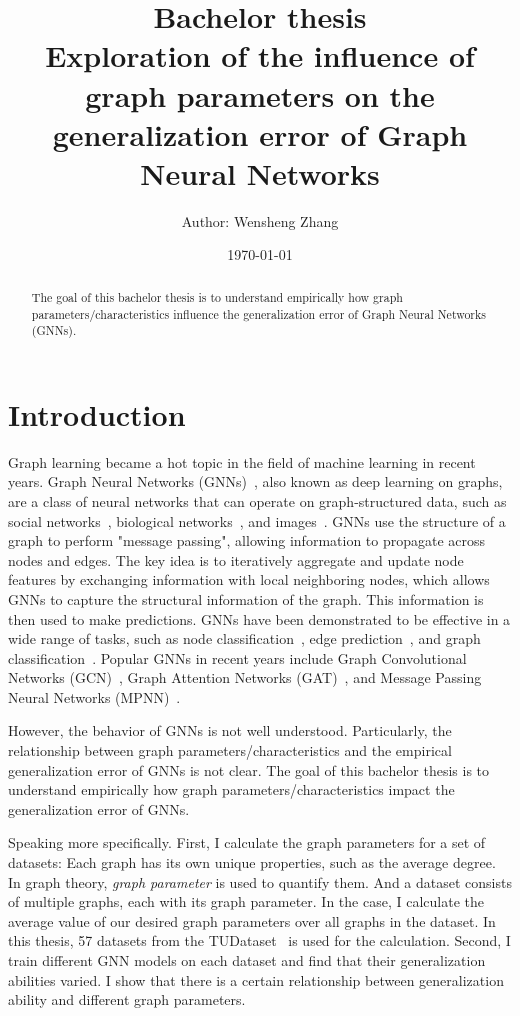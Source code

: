 \documentclass{article}
\title{\textbf{Bachelor thesis}\\
Exploration of the influence of graph parameters on the generalization error of Graph Neural Networks}
\author{Author: Wensheng Zhang}
\date{\today}
\begin{document}
 

\maketitle



\begin{abstract}
The goal of this bachelor thesis is to understand empirically how graph parameters/characteristics influence the generalization error of Graph Neural Networks (GNNs).
\end{abstract}

\section{Introduction}\label{sec:intro}
Graph learning became a hot topic in the field of machine learning in recent years. Graph Neural Networks (GNNs)~\cite{gori2005new}, also known as deep learning on graphs, are a class of neural networks that can operate on graph-structured data, such as social networks~\cite{easley2010networks}, biological networks~\cite{barabasi2004network}, and images~\cite{simonovsky2017dynamic}. GNNs use the structure of a graph to perform "message passing", allowing information to propagate across nodes and edges. The key idea is to iteratively aggregate and update node features by exchanging information with local neighboring nodes, which allows GNNs to capture the structural information of the graph. This information is then used to make predictions. GNNs have been demonstrated to be effective in a wide range of tasks, such as node classification~\cite{hamilton2017inductive}, edge prediction~\cite{morselli2021network}, and graph classification~\cite{gilmer2017neural}. Popular GNNs in recent years include Graph Convolutional Networks (GCN)~\cite{kipf2016semi}, Graph Attention Networks (GAT)~\cite{velickovic2020pointer}, and Message Passing Neural Networks (MPNN)~\cite{gilmer2017neural}.  

However, the behavior of GNNs is not well understood. Particularly, the relationship between graph parameters/characteristics and the empirical generalization error of GNNs is not clear.  The goal of this bachelor thesis is to understand empirically how graph parameters/characteristics impact the generalization error of GNNs. 

Speaking more specifically.
First, I calculate the graph parameters for a set of datasets: Each graph has its own unique properties, such as the average degree. In graph theory, \textit{graph parameter} is used to quantify them. And a dataset consists of multiple graphs, each with its graph parameter. In the case, I calculate the average value of our desired graph parameters over all graphs in the dataset. In this thesis, 57 datasets from the TUDataset~\cite{morris2020tudataset} is used for the calculation. Second, I train different GNN models on each dataset and find that their generalization abilities varied. I show that there is a certain relationship between generalization ability and different graph parameters.
\end{document}
